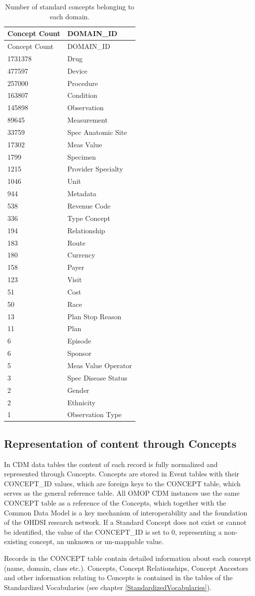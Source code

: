 \documentclass[11pt]{book}
\theoremstyle{definition}
\theoremstyle{definition}
\theoremstyle{definition}
\theoremstyle{remark}
\begin{document}
\begin{longtable}[]{@{}ll@{}}
\caption{\label{tab:domains} Number of standard concepts belonging to each domain.}\tabularnewline
\toprule
Concept Count & DOMAIN\_ID\tabularnewline
\midrule
\endfirsthead
\toprule
Concept Count & DOMAIN\_ID\tabularnewline
\midrule
\endhead
1731378 & Drug\tabularnewline
477597 & Device\tabularnewline
257000 & Procedure\tabularnewline
163807 & Condition\tabularnewline
145898 & Observation\tabularnewline
89645 & Measurement\tabularnewline
33759 & Spec Anatomic Site\tabularnewline
17302 & Meas Value\tabularnewline
1799 & Specimen\tabularnewline
1215 & Provider Specialty\tabularnewline
1046 & Unit\tabularnewline
944 & Metadata\tabularnewline
538 & Revenue Code\tabularnewline
336 & Type Concept\tabularnewline
194 & Relationship\tabularnewline
183 & Route\tabularnewline
180 & Currency\tabularnewline
158 & Payer\tabularnewline
123 & Visit\tabularnewline
51 & Cost\tabularnewline
50 & Race\tabularnewline
13 & Plan Stop Reason\tabularnewline
11 & Plan\tabularnewline
6 & Episode\tabularnewline
6 & Sponsor\tabularnewline
5 & Meas Value Operator\tabularnewline
3 & Spec Disease Status\tabularnewline
2 & Gender\tabularnewline
2 & Ethnicity\tabularnewline
1 & Observation Type\tabularnewline
\bottomrule
\end{longtable}

\hypertarget{representation-of-content-through-concepts}{%
\subsection{Representation of content through Concepts}\label{representation-of-content-through-concepts}}

In CDM data tables the content of each record is fully normalized and represented through Concepts. Concepts are stored in Event tables with their CONCEPT\_ID values, which are foreign keys to the CONCEPT table, which serves as the general reference table. All OMOP CDM instances use the same CONCEPT table as a reference of the Concepts, which together with the Common Data Model is a key mechanism of interoperability and the foundation of the OHDSI research network. If a Standard Concept does not exist or cannot be identified, the value of the CONCEPT\_ID is set to 0, representing a non-existing concept, an unknown or un-mappable value.

Records in the CONCEPT table contain detailed information about each concept (name, domain, class etc.). Concepts, Concept Relationships, Concept Ancestors and other information relating to Concepts is contained in the tables of the Standardized Vocabularies (see chapter \ref{StandardizedVocabularies}).
\end{document}
